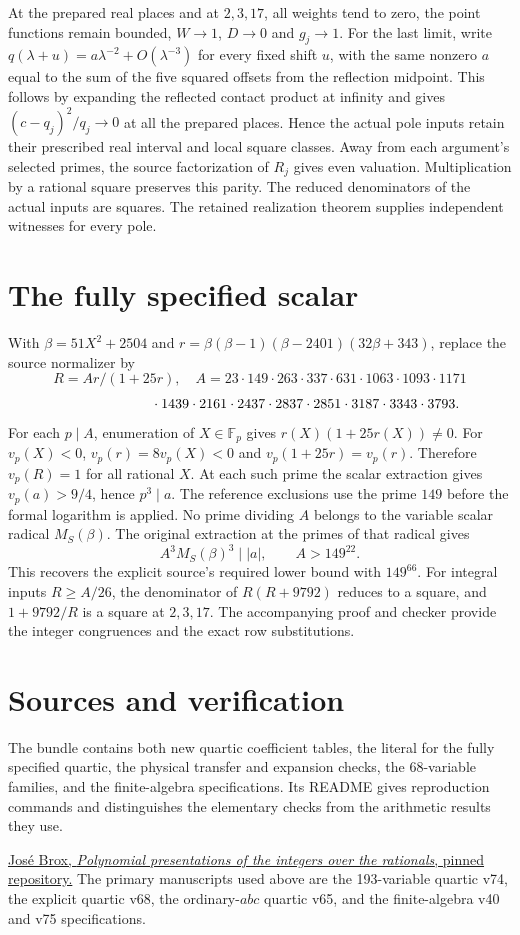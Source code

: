 \documentclass[11pt]{article}
\begin{document}
At the prepared real places and at $2,3,17$, all weights tend to zero, the point functions remain bounded, $W\to1$, $D\to0$ and $g_j\to1$. For the last limit, write $q(\lambda+u)=a\lambda^{-2}+O(\lambda^{-3})$ for every fixed shift $u$, with the same nonzero $a$ equal to the sum of the five squared offsets from the reflection midpoint. This follows by expanding the reflected contact product at infinity and gives $(c-q_j)^2/q_j\to0$ at all the prepared places. Hence the actual pole inputs retain their prescribed real interval and local square classes. Away from each argument's selected primes, the source factorization of $R_j$ gives even valuation. Multiplication by a rational square preserves this parity. The reduced denominators of the actual inputs are squares. The retained realization theorem supplies independent witnesses for every pole.

\section{The fully specified scalar}
With $\beta=51X^2+2504$ and $r=\beta(\beta-1)(\beta-2401)(32\beta+343)$, replace the source normalizer by
\[
 R=Ar/(1+25r),\quad A=23\cdot149\cdot263\cdot337\cdot631\cdot1063\cdot1093\cdot1171
\]
\[
 {}\hspace{23mm}\cdot1439\cdot2161\cdot2437\cdot2837\cdot2851\cdot3187\cdot3343\cdot3793.
\]
For each $p\mid A$, enumeration of $X\in\mathbb F_p$ gives $r(X)(1+25r(X))\ne0$. For $v_p(X)<0$, $v_p(r)=8v_p(X)<0$ and $v_p(1+25r)=v_p(r)$. Therefore $v_p(R)=1$ for all rational $X$. At each such prime the scalar extraction gives $v_p(a)>9/4$, hence $p^3\mid a$. The reference exclusions use the prime $149$ before the formal logarithm is applied. No prime dividing $A$ belongs to the variable scalar radical $M_S(\beta)$. The original extraction at the primes of that radical gives
\[
 A^3M_S(\beta)^3\mid |a|,\qquad A>149^{22}.
\]
This recovers the explicit source's required lower bound with $149^{66}$. For integral inputs $R\ge A/26$, the denominator of $R(R+9792)$ reduces to a square, and $1+9792/R$ is a square at $2,3,17$. The accompanying proof and checker provide the integer congruences and the exact row substitutions.


\section*{Sources and verification}
The bundle contains both new quartic coefficient tables, the literal for the fully specified quartic, the physical transfer and expansion checks, the 68-variable families, and the finite-algebra specifications. Its README gives reproduction commands and distinguishes the elementary checks from the arithmetic results they use.

\href{https://github.com/JoseBrox/diophantine-z-q_improvements/tree/d3a8c223716a0fc0dbf5af4eb7998d640c21048d}{Jos\'e Brox, \emph{Polynomial presentations of the integers over the rationals}, pinned repository.} The primary manuscripts used above are the 193-variable quartic v74, the explicit quartic v68, the ordinary-$abc$ quartic v65, and the finite-algebra v40 and v75 specifications.
\end{document}
